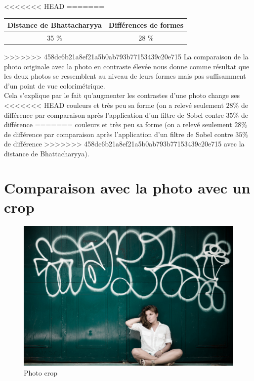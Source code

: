 \documentclass[]{article}
\begin{document}
\begin{description}
<<<<<<< HEAD
=======
\begin{center}
\begin{tabular}{|c|c|}
  \hline
  Distance de Bhattacharyya & Différences de formes \\
  \hline
  35 \% & 28 \% \\
  \hline
\end{tabular}
\end{center}

>>>>>>> 458dc6b21a8ef21a5b0ab793b77153439c20e715
La comparaison de la photo originale avec la photo en
contraste élevée nous donne comme résultat que les deux photos se
ressemblent au niveau de leurs formes mais pas suffisamment d'un point
de vue colorimétrique. \\
Cela s'explique par le fait qu'augmenter les contrastes d'une photo change ses
<<<<<<< HEAD
couleurs et très peu sa forme (on a relevé seulement $28\%$ de différence par
comparaison après l'application d'un filtre de Sobel contre $35\%$ de différence
=======
couleurs et très peu sa forme (on a relevé seulement $28 \%$ de différence par
comparaison après l'application d'un filtre de Sobel contre $35 \%$ de différence
>>>>>>> 458dc6b21a8ef21a5b0ab793b77153439c20e715
avec la distance de Bhattacharyya).

\newpage

\section{Comparaison avec la photo avec un
crop}\label{comparaison-avec-la-photo-avec-un-crop}

\begin{figure}[htbp]
\centering
\includegraphics{photos/crop.jpg}
\caption{Photo crop}
\end{figure}


\end{description}
\end{document}
